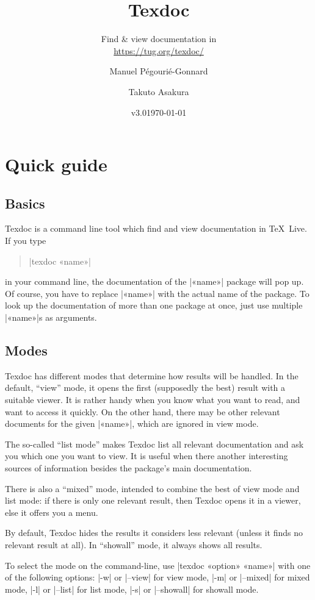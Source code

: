 \documentclass[a4paper,oneside]{scrartcl}
\title{Texdoc}
\subtitle{Find \& view documentation in \texlive\\
  \href{https://tug.org/texdoc/}{https://tug.org/texdoc/}}
\author{Manuel Pégourié-Gonnard\and Takuto Asakura}
\date{v3.0\quad \today}
\newcommand\texlive{\TeX~Live\xspace}
\begin{document}
\VerbatimFootnotes

\maketitle

\section{Quick guide}

\subsection{Basics}

Texdoc is a command line tool which find and view documentation in \texlive.
If you type
%
\begin{quote}
|texdoc «name»|
\end{quote}
%
in your command line, the documentation of the |«name»| package will pop up. Of
course, you have to replace |«name»| with the actual name of the package. To
look up the documentation of more than one package at once, just use multiple
|«name»|s as arguments.

\subsection{Modes}\label{ss-modes}

Texdoc has different modes that determine how results will be handled. In the
default, ``view'' mode, it opens the first (supposedly the best) result with a
suitable viewer. It is rather handy when you know what you want to read, and
want to access it quickly. On the other hand, there may be other relevant
documents for the given |«name»|, which are ignored in view mode.

The so-called ``list mode'' makes Texdoc list all relevant documentation and
ask you which one you want to view. It is useful when there another interesting
sources of information besides the package's main documentation.

There is also a ``mixed'' mode, intended to combine the best of view mode and
list mode: if there is only one relevant result, then Texdoc opens it in a
viewer, else it offers you a menu.

By default, Texdoc hides the results it considers less relevant (unless it
finds no relevant result at all). In ``showall'' mode, it always shows all
results.

To select the mode on the command-line, use |texdoc «option» «name»| with one
of the following options: |-w| or |--view| for view mode, |-m| or |--mixed|
for mixed mode, |-l| or |--list| for list mode, |-s| or |--showall| for
showall mode.
\end{document}
